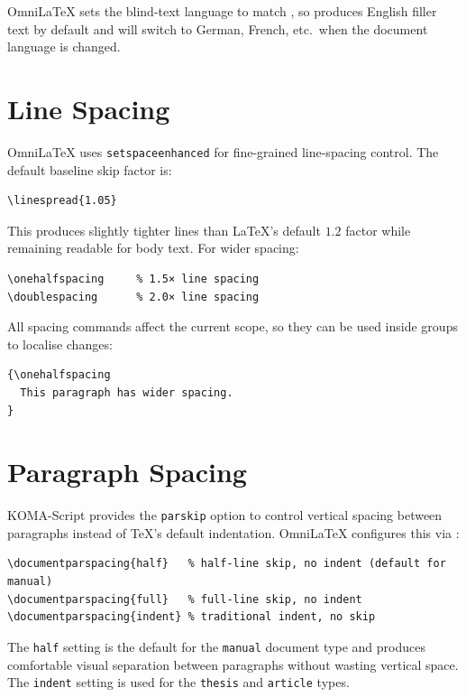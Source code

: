 OmniLaTeX sets the blind-text language to match , so
 produces English filler text by default and will switch
to German, French, etc.\ when the document language is changed.

\section{Line Spacing}

OmniLaTeX uses \texttt{setspaceenhanced} for fine-grained line-spacing
control.  The default baseline skip factor is:

\begin{verbatim}
\linespread{1.05}
\end{verbatim}

This produces slightly tighter lines than \LaTeX's default $1.2$ factor
while remaining readable for body text.  For wider spacing:

\begin{verbatim}
\onehalfspacing     % 1.5× line spacing
\doublespacing      % 2.0× line spacing
\end{verbatim}

All spacing commands affect the current scope, so they can be used inside
groups to localise changes:

\begin{verbatim}
{\onehalfspacing
  This paragraph has wider spacing.
}
\end{verbatim}

\section{Paragraph Spacing}

KOMA-Script provides the \texttt{parskip} option to control vertical
spacing between paragraphs instead of \TeX's default indentation.
OmniLaTeX configures this via :

\begin{verbatim}
\documentparspacing{half}   % half-line skip, no indent (default for manual)
\documentparspacing{full}   % full-line skip, no indent
\documentparspacing{indent} % traditional indent, no skip
\end{verbatim}

The \texttt{half} setting is the default for the \texttt{manual} document
type and produces comfortable visual separation between paragraphs without
wasting vertical space.  The \texttt{indent} setting is used for the
\texttt{thesis} and \texttt{article} types.
